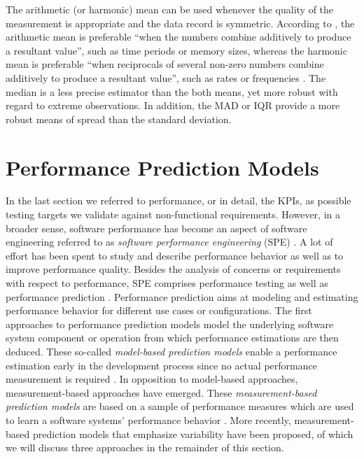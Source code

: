 The arithmetic (or harmonic) mean can be used whenever the quality of the
measurement is appropriate and the data record is symmetric. According to
\cite{shanmugam_statistics_2015}, the arithmetic mean is preferable ``when the numbers combine
additively to produce a resultant value'', such as time periods or memory sizes, whereas
the harmonic mean is preferable ``when reciprocals of several non-zero numbers
combine additively to produce a resultant value'', such as rates or frequencies
\citep{smith_characterizing_1988}.
The median is a less precise estimator than the both means, yet more robust
with regard to extreme observations. In addition, the MAD or IQR provide a more
robust means of spread than the standard deviation.

\section{Performance Prediction Models}\label{sec:performance_prediction_models} 
In the last section we referred to performance, or in detail, the KPIs, as
possible testing targets we validate against non-functional requirements.
However, in a broader sense, software performance has become an aspect of
software engineering referred to as \emph{software performance engineering}
(SPE) \citep{woodside_future_2007}.
A lot of effort has been spent to study and describe performance behavior as well
as to improve performance quality. Besides the analysis of concerns or
requirements with respect to performance, SPE comprises performance testing as
well as performance prediction \citep{woodside_future_2007}. Performance
prediction aims at modeling and estimating performance behavior for different
use cases or configurations. The first approaches to performance prediction models model the underlying software system component or operation from which
performance estimations are then deduced. These so-called \emph{model-based prediction models} enable a
performance estimation early in the development process since no actual
performance measurement is required \citep{woodside_future_2007}. In opposition
to model-based approaches, measurement-based approaches have emerged. These \emph{measurement-based prediction models} are based on a sample of performance
measures which are used to learn a software systems’ performance behavior
\citep{woodside_future_2007}. More recently, measurement-based prediction models that emphasize variability have been
proposed, of which we will discuss three approaches in the remainder of
this section.

